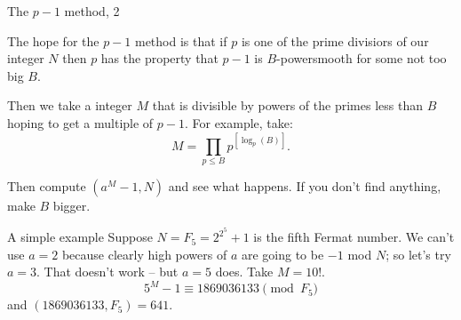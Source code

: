 \documentclass{beamer}
\begin{document}
\begin{frame}{The $p-1$ method, 2}
	
	The hope for the $p-1$ method is that if $p$ is one  of the prime divisiors of our integer $N$ then $p$ has the property that $p-1$ is $B$-powersmooth
	for some not too big $B$. 

	\bigskip\noindent
	Then we take a integer $M$ that is divisible by powers of the primes less than $B$ hoping to get a multiple of $p-1$. 
	For example, take:
	$$
	M=\prod_{p\le B} p^{[\log_{p}(B)]}.
	$$

	\bigskip\noindent
	Then compute $(a^{M}-1,N)$ and see what happens.  If you don't find anything, make $B$ bigger.

\end{frame}
\begin{frame}{A simple example}
	Suppose $N=F_{5}=2^{2^5}+1$ is the fifth Fermat number.  We can't use $a=2$ because clearly high powers of $a$ are going to be 
	$-1$ mod $N$; so let's try $a=3$. That doesn't work -- but $a=5$ does. Take $M=10!$.  
	$$
	5^M-1 \equiv 1869036133\pmod{F_{5}}
	$$
	and $(1869036133,F_{5})=641$. 
\end{frame}
\end{document}
